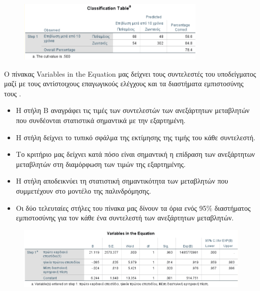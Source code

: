 \clearpage

\begin{figure}[ht]
    \centering
    \includegraphics[width=0.8\textwidth]{images/510.PNG}
\end{figure}

Ο πίνακας Variables in the Equation μας δείχνει τους συντελεστές του υποδείγματος μαζί με τους αντίστοιχους επαγωγικούς ελέγχους και τα διαστήματα εμπιστοσύνης τους . 
\vspace{1cm}

\begin{itemize}
    \item Η στήλη Β αναγράφει τις τιμές των συντελεστών των ανεξάρτητων μεταβλητών που συνδέονται στατιστικά σημαντικά με την εξαρτημένη.
    \item Η στήλη  δείχνει το τυπικό σφάλμα της εκτίμησης της τιμής του κάθε συντελεστή.
    \item Το κριτήριο  μας δείχνει κατά πόσο είναι σημαντική η επίδραση των ανεξάρτητων μεταβλητών στη διαμόρφωση των τιμών της εξαρτημένης. 
    \item Η στήλη  αποδεικνύει τη στατιστική σημαντικότητα των μεταβλητών που συμμετέχουν στο μοντέλο της παλινδρόμησης.
    \item Οι δύο τελευταίες στήλες του πίνακα μας δίνουν τα όρια ενός 95\% διαστήματος εμπιστοσύνης για τον κάθε ένα συντελεστή των ανεξάρτητων μεταβλητών.
\end{itemize}

\vspace{1cm}

\begin{figure}[h]
    \centering
    \includegraphics[width=\textwidth]{images/511.PNG}
\end{figure}

